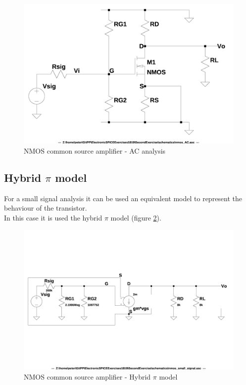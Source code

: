 \documentclass[10pt,a4paper]{book}
\begin{document}
\begin{figure}[h]
  \centering
  \includegraphics[width=12cm]{schematics/nmos_AC.jpg}
  \caption{NMOS common source amplifier - AC analysis}
  \label{nmos_AC}
\end{figure}

\subsection{Hybrid $\pi$ model}
For a small signal analysis it can be used an equivalent model to represent the behaviour of the transistor.\\
In this case it is used the hybrid $\pi$ model (figure \ref{nmos_pi}).\par

\begin{figure}[h]
  \centering
  \includegraphics[width=12cm]{schematics/nmos_small_signal.jpg}
  \caption{NMOS common source amplifier - Hybrid $\pi$ model}
  \label{nmos_pi}
\end{figure}
\end{document}
